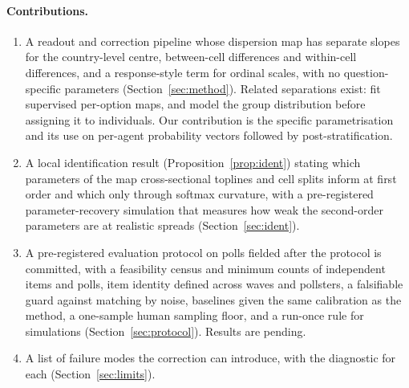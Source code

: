 \documentclass[11pt]{article}
\begin{document}
\paragraph{Contributions.}
\begin{enumerate}
  \item A readout and correction pipeline whose dispersion map has separate slopes for the country-level centre, between-cell differences and within-cell differences, and a response-style term for ordinal scales, with no question-specific parameters (Section~\ref{sec:method}). Related separations exist: \citet{kambhatla2025supervision} fit supervised per-option maps, and \citet{ozkan2026distribution} model the group distribution before assigning it to individuals. Our contribution is the specific parametrisation and its use on per-agent probability vectors followed by post-stratification.
  \item A local identification result (Proposition~\ref{prop:ident}) stating which parameters of the map cross-sectional toplines and cell splits inform at first order and which only through softmax curvature, with a pre-registered parameter-recovery simulation that measures how weak the second-order parameters are at realistic spreads (Section~\ref{sec:ident}).
  \item A pre-registered evaluation protocol on polls fielded after the protocol is committed, with a feasibility census and minimum counts of independent items and polls, item identity defined across waves and pollsters, a falsifiable guard against matching by noise, baselines given the same calibration as the method, a one-sample human sampling floor, and a run-once rule for simulations (Section~\ref{sec:protocol}). Results are pending.
  \item A list of failure modes the correction can introduce, with the diagnostic for each (Section~\ref{sec:limits}).
\end{enumerate}
\end{document}
